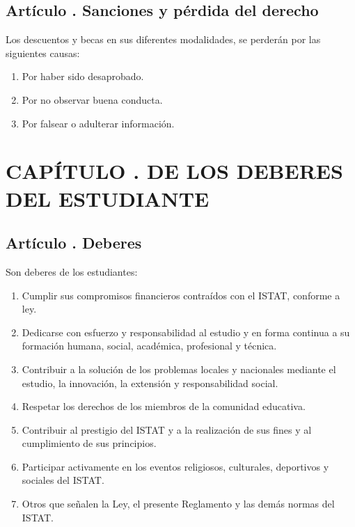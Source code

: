 \subsection{Artículo . Sanciones y pérdida del derecho}
\addtocounter{ns}{1}
Los descuentos y becas en sus diferentes modalidades, se perderán por las siguientes causas: 
\begin{enumerate}
\item Por haber sido desaprobado. 
\item Por no observar buena conducta. 
\item Por falsear o adulterar información.
\end{enumerate}
\section{CAPÍTULO . DE LOS DEBERES DEL ESTUDIANTE}
\addtocounter{re}{1}

\subsection{Artículo . Deberes}
\addtocounter{ns}{1}
Son deberes de los estudiantes: 
\begin{enumerate}
\item Cumplir sus compromisos financieros contraídos con el ISTAT, conforme a ley. 
\item Dedicarse con esfuerzo y responsabilidad al estudio y en forma continua a su formación humana, social, académica, profesional y técnica. 
\item Contribuir a la solución de los problemas locales y nacionales mediante el estudio, la innovación, la extensión y responsabilidad social. 
\item Respetar los derechos de los miembros de la comunidad educativa. 
\item Contribuir al prestigio del ISTAT y a la realización de sus fines y al cumplimiento de sus principios. 
\item Participar activamente en los eventos religiosos, culturales, deportivos y sociales del ISTAT. 
\item Otros que señalen la Ley, el presente Reglamento y las demás normas del ISTAT.
\end{enumerate}
